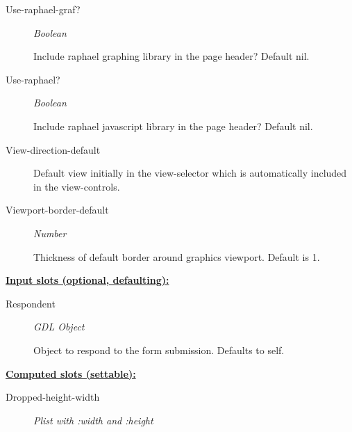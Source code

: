 \documentclass [11pt]{book}
\begin{document}
\begin{itemize}
\begin{description}
\item [Use-raphael-graf?]
\emph{Boolean}

 Include raphael graphing library in the page header?
Default nil.




\item [Use-raphael?]
\emph{Boolean}

 Include raphael javascript library in the page header?
Default nil.




\item [View-direction-default]

Default view initially in the view-selector which is
automatically included in the view-controls.




\item [Viewport-border-default]
\emph{Number}

 Thickness of default border around graphics viewport.
Default is 1.




\end{description}






\textbf{
\underline{Input slots (optional, defaulting):}}

\begin{description}

\item [Respondent]
\emph{GDL Object}

 Object to respond to the form submission. Defaults to self.




\end{description}






\textbf{
\underline{Computed slots (settable):}}

\begin{description}

\item [Dropped-height-width]
\emph{Plist with :width and :height}


\end{description}
\end{itemize}
\end{document}
